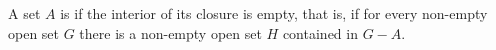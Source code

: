 A set $A$ is  if the interior of its closure is empty, that is, if for every non-empty open set $G$ there is a non-empty open set $H$ contained in $G - A$.
